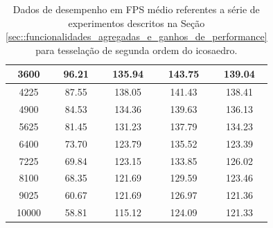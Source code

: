 \documentclass[
    12pt,                %
    oneside,            %
    a4paper,            %
    english,            %
    french,                %
    spanish,            %
    brazil                %
    ]{abntex2}
\begin{document}
\begin{apendicesenv}
\begin{table}[htb]
\begin{tabular}{c|c|c|c|c|}
\multicolumn{1}{|c|}{3600}      &  96.21              & 135.94         & 143.75                & 139.04              \\ \hline
\multicolumn{1}{|c|}{4225}      &  87.55              & 138.05         & 141.43                & 138.41              \\ \hline
\multicolumn{1}{|c|}{4900}      &  84.53              & 134.36         & 139.63                & 136.13              \\ \hline
\multicolumn{1}{|c|}{5625}      &  81.45              & 131.23         & 137.79                & 134.23              \\ \hline
\multicolumn{1}{|c|}{6400}      &  73.70              & 123.79         & 135.52                & 123.39              \\ \hline
\multicolumn{1}{|c|}{7225}      &  69.84              & 123.15         & 133.85                & 126.02              \\ \hline
\multicolumn{1}{|c|}{8100}      &  68.35              & 121.69         & 129.59                & 123.46              \\ \hline
\multicolumn{1}{|c|}{9025}      &  60.67              & 121.69         & 126.97                & 121.36              \\ \hline
\multicolumn{1}{|c|}{10000}     &  58.81              & 115.12         & 124.09                & 121.33              \\ \hline
\end{tabular}
\caption{Dados de desempenho em FPS médio referentes a série de experimentos descritos na Seção \ref{sec::funcionalidades_agregadas_e_ganhos_de_performance} para tesselação de segunda ordem do icosaedro.}
\label{tab::testes_2}
\end{table}


\end{apendicesenv}
\end{document}
